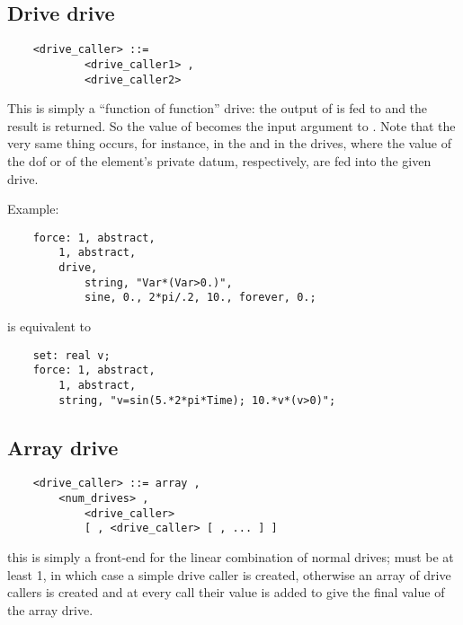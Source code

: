 \subsection{Drive drive}
\begin{verbatim}
    <drive_caller> ::=
            <drive_caller1> , 
            <drive_caller2>
\end{verbatim}
This is simply a ``function of function'' drive: the output 
of  is fed to 
and the result is returned.
So the value of  becomes the input argument
to .
Note that the very same thing occurs, for instance, in the
 and in the  drives, where the value of the dof
or of the element's private datum, respectively, are fed 
into the given drive.

\noindent
Example:
\begin{verbatim}
    force: 1, abstract,
        1, abstract,
        drive,
            string, "Var*(Var>0.)",
            sine, 0., 2*pi/.2, 10., forever, 0.;
\end{verbatim}
is equivalent to
\begin{verbatim}
    set: real v;
    force: 1, abstract,
        1, abstract,
        string, "v=sin(5.*2*pi*Time); 10.*v*(v>0)";
\end{verbatim}


\subsection{Array drive}
\begin{verbatim}
    <drive_caller> ::= array ,
        <num_drives> ,
            <drive_caller> 
            [ , <drive_caller> [ , ... ] ]
\end{verbatim}
this is simply a front-end for the linear combination of  
normal drives;  must be at least 1, in which case 
a simple drive caller is created, otherwise an array of drive callers 
is created and at every call their value is added to give 
the final value of the array drive.


